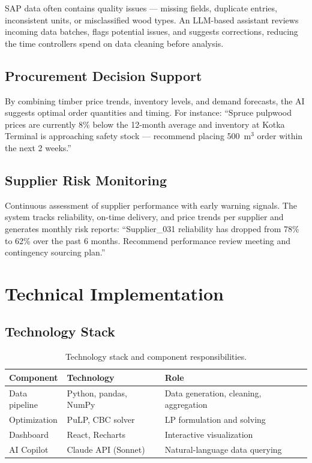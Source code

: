 \documentclass[11pt,a4paper]{article}
\begin{document}
SAP data often contains quality issues --- missing fields, duplicate entries, inconsistent units, or misclassified wood types. An LLM-based assistant reviews incoming data batches, flags potential issues, and suggests corrections, reducing the time controllers spend on data cleaning before analysis.

\subsection{Procurement Decision Support}

By combining timber price trends, inventory levels, and demand forecasts, the AI suggests optimal order quantities and timing. For instance: ``Spruce pulpwood prices are currently 8\% below the 12-month average and inventory at Kotka Terminal is approaching safety stock --- recommend placing 500~m$^3$ order within the next 2 weeks.''

\subsection{Supplier Risk Monitoring}

Continuous assessment of supplier performance with early warning signals. The system tracks reliability, on-time delivery, and price trends per supplier and generates monthly risk reports: ``Supplier\_031 reliability has dropped from 78\% to 62\% over the past 6 months. Recommend performance review meeting and contingency sourcing plan.''


\section{Technical Implementation}

\subsection{Technology Stack}

\begin{table}[H]
\centering
\caption{Technology stack and component responsibilities.}
\begin{tabular}{@{}lll@{}}
\toprule
\textbf{Component} & \textbf{Technology} & \textbf{Role} \\
\midrule
Data pipeline       & Python, pandas, NumPy  & Data generation, cleaning, aggregation \\
Optimization        & PuLP, CBC solver       & LP formulation and solving \\
Dashboard           & React, Recharts        & Interactive visualization \\
AI Copilot          & Claude API (Sonnet)    & Natural-language data querying \\
\bottomrule
\end{tabular}
\end{table}
\end{document}
